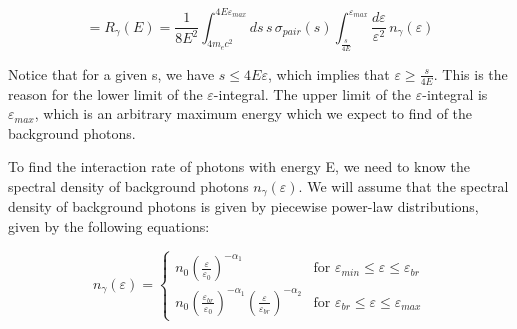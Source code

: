 \begin{equation}
    = R_{\gamma}(E) = \frac{1}{8E^2}\int_{4m_ec^2}^{4E\varepsilon_{max}}ds\,s\,\sigma_{pair}(s)\int_{\frac{s}{4E}}^{\varepsilon_{max}}\frac{d\varepsilon}{\varepsilon^2}\,n_{\gamma}(\varepsilon)
    \label{eq:interaction_rate_third_one}
\end{equation}

Notice that for a given s, we have $s \leq 4E\varepsilon$, which implies that $\varepsilon \geq \frac{s}{4E}$. This is the reason for the lower limit of the $\varepsilon$-integral. The upper limit of the $\varepsilon$-integral is $\varepsilon_{max}$, which is an arbitrary maximum energy which we expect to find of the background photons.

To find the interaction rate of photons with energy E, we need to know the spectral density of background photons $n_{\gamma}(\varepsilon)$. We will assume that the spectral density of background photons is given by piecewise power-law distributions, given by the following equations:

\begin{equation}
    n_{\gamma}(\varepsilon) = \left\{
    \begin{array}{ll}
        n_0\left(\frac{\varepsilon}{\varepsilon_0}\right)^{-\alpha_1} & \text{for } \varepsilon_{min} \leq \varepsilon \leq \varepsilon_{br} \\
        n_0\left(\frac{\varepsilon_{br}}{\varepsilon_0}\right)^{-\alpha_1}\left(\frac{\varepsilon}{\varepsilon_{br}}\right)^{-\alpha_2} & \text{for } \varepsilon_{br} \leq \varepsilon \leq \varepsilon_{max}
    \end{array}
    \right.
    \label{eq:spectral_density}
\end{equation}



